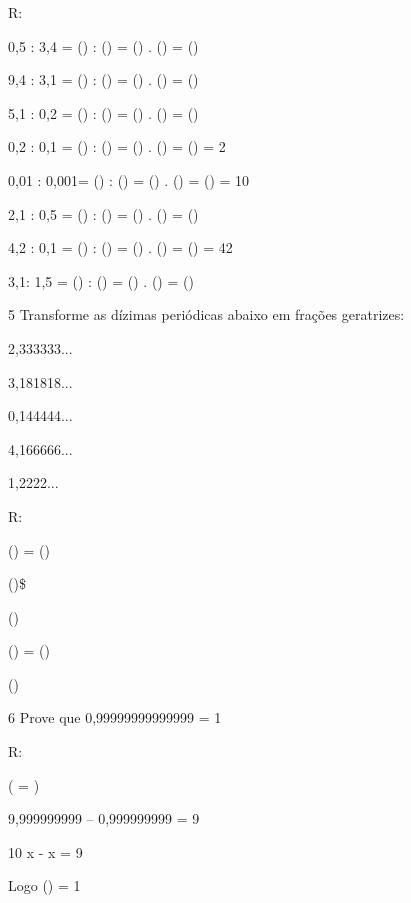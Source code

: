 R:
\item 0,5 : 3,4 = () : () = () .
() = ()
\item 9,4 : 3,1 = () : () = ()
. () = ()
\item 5,1 : 0,2 = () : () = ()
. () = ()
\item 0,2 : 0,1 = () : () = () .
() = () = 2
\item 0,01 : 0,001= () : () =
() . () = () = 10
\item 2,1 : 0,5 = () : () = ()
. () = ()
\item 4,2 : 0,1 = () : () = ()
. () = () = 42
\item 3,1: 1,5 = () : () = ()
. () = ()

\num{5} Transforme as dízimas periódicas abaixo em frações geratrizes:
\item 2,333333...
\item 3,181818...
\item 0,144444...
\item 4,166666...
\item 1,2222...

R:
\item () = ()
\item ()\$
\item ()
\item () = ()
\item ()

\num{6} Prove que 0,99999999999999 = 1

R:

( = )

9,999999999 -- 0,999999999 = 9

10 x - x = 9

Logo () = 1



